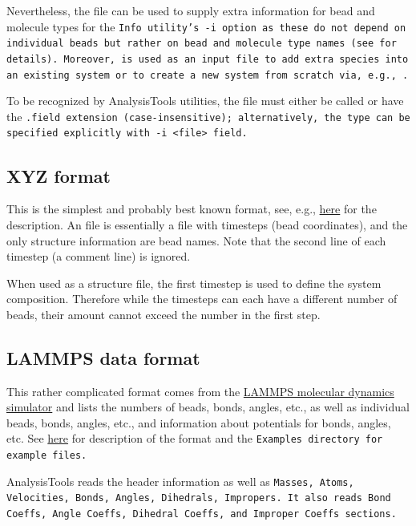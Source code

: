 Nevertheless, the file can be used to supply extra information for bead and
molecule types for the \tt{Info} utility's \tt{-i} option as these do not
depend on individual beads but rather on bead and molecule type names (see  for details). Moreover, \field is used as an input file to add
extra species into an existing system or to create a new system from scratch
via, e.g., .

To be recognized by AnalysisTools utilities, the file must either be called
\field or have the \tt{.field} extension (case-insensitive); alternatively,
the type can be specified explicitly with \tt{-i <file> field}.

\subsection{XYZ format}\label{ssec:StructXyz} %

This is the simplest and probably best known format, see, e.g.,
\href{https://openbabel.org/docs/dev/FileFormats/XYZ_cartesian_coordinates_format.html}{here}
for the description. An \xyz file is essentially a file with timesteps (bead
coordinates), and the only structure information are bead names. Note that the
second line of each timestep (a comment line) is ignored.

When used as a structure file, the first timestep is used to define the system
composition. Therefore while the timesteps can each have a different number of
beads, their amount cannot exceed the number in the first step.


\subsection{LAMMPS data format}\label{ssec:StructLdata} %

This rather complicated format comes from the
\href{https://lammps.sandia.gov/}{LAMMPS molecular dynamics simulator} and lists
the numbers of beads, bonds, angles, etc., as well as individual beads, bonds,
angles, etc., and information about potentials for bonds, angles, etc. See
\href{https://docs.lammps.org/2001/data_format.html}{here} for description of
the format and the \tt{Examples} directory for example files.

AnalysisTools reads the header information as well as \tt{Masses}, \tt{Atoms},
\tt{Velocities}, \tt{Bonds}, \tt{Angles}, \tt{Dihedrals}, \tt{Impropers}. It
also reads \tt{Bond Coeffs}, \tt{Angle Coeffs}, \tt{Dihedral Coeffs}, and
\tt{Improper Coeffs} sections.

